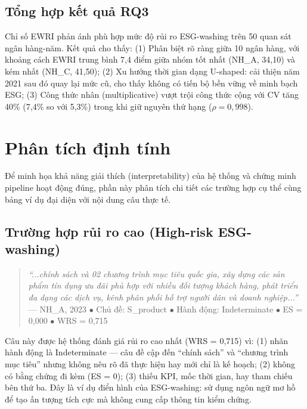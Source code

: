 \subsection{Tổng hợp kết quả RQ3}
\label{subsec:rq3_answer}

\begin{tcolorbox}[colback=gray!5, colframe=gray!60, title=Trả lời RQ3]
Chỉ số EWRI phản ánh phù hợp mức độ rủi ro ESG-washing trên 50 quan sát ngân hàng-năm. Kết quả cho thấy: (1) Phân biệt rõ ràng giữa 10 ngân hàng, với khoảng cách EWRI trung bình 7,4 điểm giữa nhóm tốt nhất (NH\_A, 34,10) và kém nhất (NH\_C, 41,50); (2) Xu hướng thời gian dạng U-shaped: cải thiện năm 2021 sau đó quay lại mức cũ, cho thấy không có tiến bộ bền vững về minh bạch ESG; (3) Công thức nhân (multiplicative) vượt trội công thức cộng với CV tăng 40\% (7,4\% so với 5,3\%) trong khi giữ nguyên thứ hạng ($\rho = 0{,}998$).
\end{tcolorbox}


\section{Phân tích định tính}
\label{sec:qualitative}

Để minh họa khả năng giải thích (interpretability) của hệ thống và chứng minh pipeline hoạt động đúng, phần này phân tích chi tiết các trường hợp cụ thể cùng bảng ví dụ đại diện với nội dung câu thực tế.

\subsection{Trường hợp rủi ro cao (High-risk ESG-washing)}
\label{subsec:high_risk_case}

\begin{quote}
\textit{``...chính sách và 02 chương trình mục tiêu quốc gia, xây dựng các sản phẩm tín dụng ưu đãi phù hợp với nhiều đối tượng khách hàng, phát triển đa dạng các dịch vụ, kênh phân phối hỗ trợ người dân và doanh nghiệp...''} \\
--- NH\_A, 2023 \quad $\bullet$ Chủ đề: S\_product \quad $\bullet$ Hành động: Indeterminate \quad $\bullet$ ES = 0,000 \quad $\bullet$ WRS = 0,715
\end{quote}

Câu này được hệ thống đánh giá rủi ro cao nhất (WRS = 0,715) vì: (1) nhãn hành động là Indeterminate --- câu đề cập đến ``chính sách'' và ``chương trình mục tiêu'' nhưng không nêu rõ đã thực hiện hay mới chỉ là kế hoạch; (2) không có bằng chứng đi kèm (ES = 0); (3) thiếu KPI, mốc thời gian, hay tham chiếu bên thứ ba. Đây là ví dụ điển hình của ESG-washing: sử dụng ngôn ngữ mơ hồ để tạo ấn tượng tích cực mà không cung cấp thông tin kiểm chứng.

